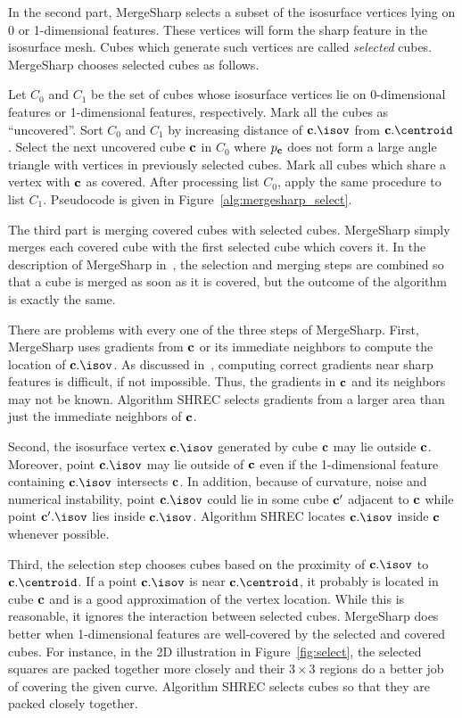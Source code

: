 In the second part, MergeSharp selects a subset of the isosurface vertices
lying on 0 or 1-dimensional features.
These vertices will form the sharp feature in the isosurface mesh.
Cubes which generate such vertices are called {\em selected} cubes.
MergeSharp chooses selected cubes as follows.

Let $C_0$ and $C_1$ be the set of cubes whose isosurface vertices
lie on 0-dimensional features or 1-dimensional features, respectively.
Mark all the cubes as ``uncovered''.
Sort $C_0$ and $C_1$ by increasing distance
of $\cb.\isov$ from $\cb.\centroid$.
Select the next uncovered cube $\mathbf{c}$ in $C_0$
where $p_{\mathbf{c}}$ does not form a large angle triangle 
with vertices in previously selected cubes.
Mark all cubes which share a vertex with $\mathbf{c}$ as covered.
After processing list $C_0$, apply the same procedure to list $C_1$.
Pseudocode is given in Figure~\ref{alg:mergesharp_select}.

The third part is merging covered cubes with selected cubes.
MergeSharp simply merges each covered cube with the first selected cube
which covers it.
In the description of MergeSharp in~\cite{bw-cisec-13}, 
the selection and merging steps are combined
so that a cube is merged as soon as it is covered,
but the outcome of the algorithm is exactly the same.

There are problems with every one of the three steps of MergeSharp.
First, MergeSharp uses gradients from $\mathbf{c}$ or its immediate neighbors
to compute the location of $\cb.\isov$.
As discussed in~\cite{bw-isifsd-15},
computing correct gradients near sharp features is difficult,
if not impossible.
Thus, the gradients in $\mathbf{c}$ and its neighbors may not be known.
Algorithm SHREC selects gradients from a larger area
than just the immediate neighbors of $\mathbf{c}$.

Second, the isosurface vertex $\cb.\isov$ generated by cube $\mathbf{c}$
may lie outside $\mathbf{c}$.
Moreover, point $\cb.\isov$ may lie outside of $\mathbf{c}$
even if the 1-dimensional feature containing $\cb.\isov$ intersects $\mathbf{c}$.
In addition, because of curvature, noise and numerical instability,
point $\cb.\isov$ could lie in some cube $\mathbf{c}'$ adjacent to $\mathbf{c}$
while point $\cb'.\isov$ lies inside $\cb.\isov$.
Algorithm SHREC locates $\cb.\isov$ inside $\mathbf{c}$ whenever possible.

Third, the selection step chooses cubes based on the proximity
of $\cb.\isov$ to $\cb.\centroid$.
If a point $\cb.\isov$ is near $\cb.\centroid$,
it probably is located in cube $\mathbf{c}$ 
and is a good approximation of the vertex location.
While this is reasonable,
it ignores the interaction between selected cubes.
MergeSharp does better when 1-dimensional features are well-covered 
by the selected and covered cubes.
For instance, in the 2D illustration in Figure~\ref{fig:select}, 
the selected squares are packed together more closely
and their $3 \times 3$ regions do a better job of covering
the given curve.
Algorithm SHREC selects cubes so that they are packed closely together.

